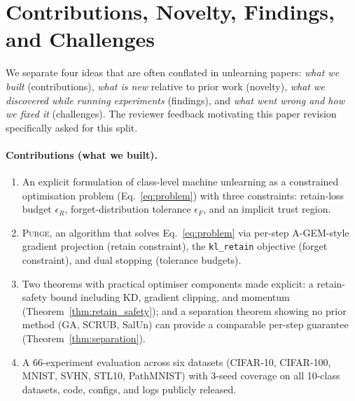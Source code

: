 \documentclass{article}
\newcommand{\ours}{\textsc{Purge}}
\newcommand{\klr}{\texttt{kl\_retain}}
\newcommand{\new}[1]{{\color{orange}#1}}
\begin{document}
\new{
\section{Contributions, Novelty, Findings, and Challenges}\label{sec:contrib}

We separate four ideas that are often conflated in unlearning papers: \emph{what we built} (contributions), \emph{what is new} relative to prior work (novelty), \emph{what we discovered while running experiments} (findings), and \emph{what went wrong and how we fixed it} (challenges). The reviewer feedback motivating this paper revision specifically asked for this split.

\paragraph{Contributions (what we built).}
\begin{enumerate}[nosep,leftmargin=*]
\item An explicit formulation of class-level machine unlearning as a constrained optimisation problem (Eq.~\ref{eq:problem}) with three constraints: retain-loss budget $\epsilon_R$, forget-distribution tolerance $\epsilon_F$, and an implicit trust region.
\item \ours{}, an algorithm that solves Eq.~\ref{eq:problem} via per-step A-GEM-style gradient projection (retain constraint), the \klr{} objective (forget constraint), and dual stopping (tolerance budgets).
\item Two theorems with practical optimiser components made explicit: a retain-safety bound including KD, gradient clipping, and momentum (Theorem~\ref{thm:retain_safety}); and a separation theorem showing no prior method (GA, SCRUB, SalUn) can provide a comparable per-step guarantee (Theorem~\ref{thm:separation}).
\item A \new{66}-experiment evaluation across \new{six} datasets (CIFAR-10, \new{CIFAR-100,} MNIST, SVHN, STL10, PathMNIST) with \new{3-seed coverage on all 10-class datasets,} code, configs, and logs publicly released.
\end{enumerate}

}
\end{document}
